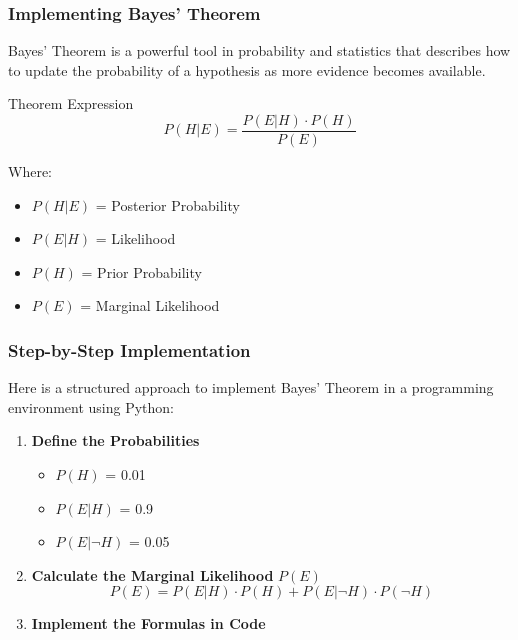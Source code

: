 \documentclass[aspectratio=169]{beamer}
\begin{document}
\begin{frame}
    \frametitle{Implementing Bayes' Theorem}
    Bayes' Theorem is a powerful tool in probability and statistics that describes how to update the probability of a hypothesis as more evidence becomes available. 

    \begin{block}{Theorem Expression}
        \begin{equation}
        P(H|E) = \frac{P(E|H) \cdot P(H)}{P(E)}
        \end{equation}
    \end{block}
    Where:
    \begin{itemize}
        \item \( P(H|E) \) = Posterior Probability
        \item \( P(E|H) \) = Likelihood
        \item \( P(H) \) = Prior Probability
        \item \( P(E) \) = Marginal Likelihood
    \end{itemize}
\end{frame}

\begin{frame}
    \frametitle{Step-by-Step Implementation}
    Here is a structured approach to implement Bayes' Theorem in a programming environment using Python:

    \begin{enumerate}
        \item \textbf{Define the Probabilities}
            \begin{itemize}
                \item \( P(H) \) = 0.01
                \item \( P(E|H) \) = 0.9
                \item \( P(E|\neg H) \) = 0.05
            \end{itemize}
        \item \textbf{Calculate the Marginal Likelihood} \( P(E) \)
            \begin{equation}
            P(E) = P(E|H) \cdot P(H) + P(E|\neg H) \cdot P(\neg H)
            \end{equation}
        \item \textbf{Implement the Formulas in Code}
    \end{enumerate}
\end{frame}
\end{document}
